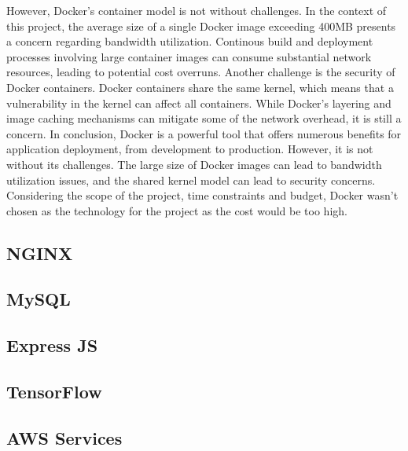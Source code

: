 However, Docker's container model is not without challenges. In the context of this project, the average size of a single Docker image exceeding 400MB presents a concern regarding bandwidth utilization. Continous build and deployment processes involving large container images can consume substantial network resources, leading to potential cost overruns. \cite{merkel2014docker}
Another challenge is the security of Docker containers. Docker containers share the same kernel, which means that a vulnerability in the kernel can affect all containers. \cite{dockerhub}
While Docker's layering and image caching mechanisms can mitigate some of the network overhead, it is still a concern. 
In conclusion, Docker is a powerful tool that offers numerous benefits for application deployment, from development to production. However, it is not without its challenges. The large size of Docker images can lead to bandwidth utilization issues, and the shared kernel model can lead to security concerns. Considering the scope of the project, time constraints and budget, Docker wasn't chosen as the technology for the project as the cost would be too high.   






\subsection{NGINX}

\subsection{MySQL}

\subsection{Express JS}

\subsection{TensorFlow}

\subsection{AWS Services}

